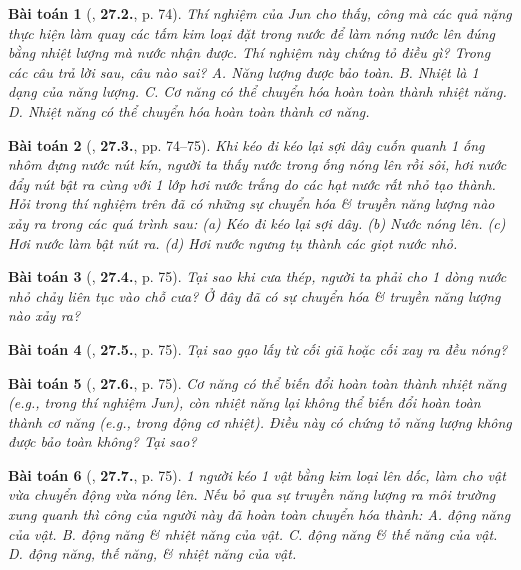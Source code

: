 \documentclass{article}
\numberwithin{equation}{section}
\newtheorem{baitoan}{Bài toán}
\begin{document}
\begin{baitoan}[\cite{SBT_Vat_Ly_8}, \textbf{27.2.}, p. 74]
	Thí nghiệm của Jun cho thấy, công mà các quả nặng thực hiện làm quay các tấm kim loại đặt trong nước để làm nóng nước lên đúng bằng nhiệt lượng mà nước nhận được. Thí nghiệm này chứng tỏ điều gì? Trong các câu trả lời sau, câu nào sai? {\sf A.} Năng lượng được bảo toàn. {\sf B.} Nhiệt là 1 dạng của năng lượng. {\sf C.} Cơ năng có thể chuyển hóa hoàn toàn thành nhiệt năng. {\sf D.} Nhiệt năng có thể chuyển hóa hoàn toàn thành cơ năng.
\end{baitoan}

\begin{baitoan}[\cite{SBT_Vat_Ly_8}, \textbf{27.3.}, pp. 74--75]
	Khi kéo đi kéo lại sợi dây cuốn quanh 1 ống nhôm đựng nước nút kín, người ta thấy nước trong ống nóng lên rồi sôi, hơi nước đẩy nút bật ra cùng với 1 lớp hơi nước trắng do các hạt nước rất nhỏ tạo thành. Hỏi trong thí nghiệm trên đã có những sự chuyển hóa \& truyền năng lượng nào xảy ra trong các quá trình sau: (a) Kéo đi kéo lại sợi dây. (b) Nước nóng lên. (c) Hơi nước làm bật nút ra. (d) Hơi nước ngưng tụ thành các giọt nước nhỏ.
\end{baitoan}

\begin{baitoan}[\cite{SBT_Vat_Ly_8}, \textbf{27.4.}, p. 75]
	Tại sao khi cưa thép, người ta phải cho 1 dòng nước nhỏ chảy liên tục vào chỗ cưa? Ở đây đã có sự chuyển hóa \& truyền năng lượng nào xảy ra?
\end{baitoan}

\begin{baitoan}[\cite{SBT_Vat_Ly_8}, \textbf{27.5.}, p. 75]
	Tại sao gạo lấy từ cối giã hoặc cối xay ra đều nóng?
\end{baitoan}

\begin{baitoan}[\cite{SBT_Vat_Ly_8}, \textbf{27.6.}, p. 75]
	Cơ năng có thể biến đổi hoàn toàn thành nhiệt năng (e.g., trong thí nghiệm Jun), còn nhiệt năng lại không thể biến đổi hoàn toàn thành cơ năng (e.g., trong động cơ nhiệt). Điều này có chứng tỏ năng lượng không được bảo toàn không? Tại sao?
\end{baitoan}

\begin{baitoan}[\cite{SBT_Vat_Ly_8}, \textbf{27.7.}, p. 75]
	1 người kéo 1 vật bằng kim loại lên dốc, làm cho vật vừa chuyển động vừa nóng lên. Nếu bỏ qua sự truyền năng lượng ra môi trường xung quanh thì công của người này đã hoàn toàn chuyển hóa thành: {\sf A.} động năng của vật. {\sf B.} động năng \& nhiệt năng của vật. {\sf C.} động năng \& thế năng của vật. {\sf D.} động năng, thế năng, \& nhiệt năng của vật.
\end{baitoan}
\end{document}
